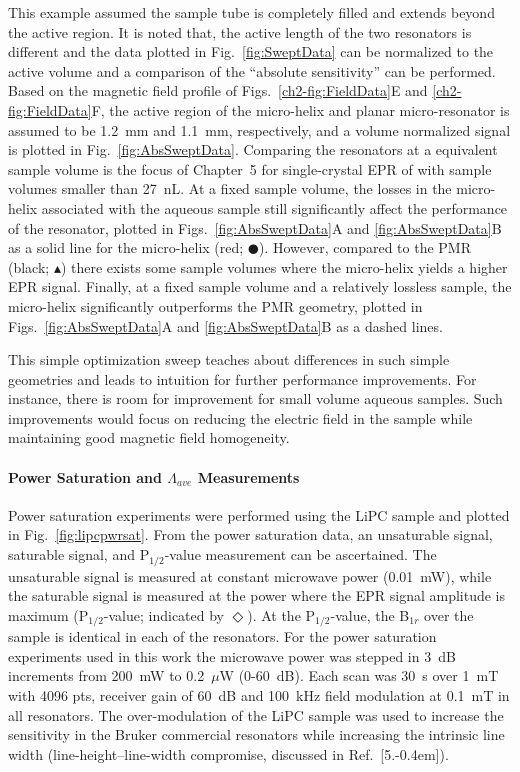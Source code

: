 This example assumed the sample tube is completely filled and extends beyond the active region. It is noted that, the active length of the two resonators is different and the data plotted in Fig.~\ref{fig:SweptData} can be normalized to the active volume and a comparison of the ``absolute sensitivity'' can be performed. Based on the magnetic field profile of  Figs.~\ref{ch2-fig:FieldData}E and \ref{ch2-fig:FieldData}F, the active region of the micro-helix and planar micro-resonator is assumed to be 1.2~mm and 1.1~mm, respectively, and a volume normalized signal is plotted in Fig.~\ref{fig:AbsSweptData}. Comparing the resonators at a equivalent sample volume is the focus of Chapter~5 for single-crystal EPR of with sample volumes smaller than 27~nL. At a fixed sample volume, the losses in the micro-helix associated with the aqueous sample still significantly affect the performance of the resonator, plotted in Figs.~\ref{fig:AbsSweptData}A and \ref{fig:AbsSweptData}B as a solid line for the micro-helix (red; $\CIRCLE$). However, compared to the PMR (black; $\blacktriangle$) there exists some sample volumes where the micro-helix yields a higher EPR signal. Finally, at a fixed sample volume and a relatively lossless sample, the micro-helix significantly outperforms the PMR geometry, plotted in Figs.~\ref{fig:AbsSweptData}A and \ref{fig:AbsSweptData}B as a dashed lines.

This simple optimization sweep teaches about differences in such simple geometries and leads to intuition for further performance improvements. For instance, there is room for improvement for small volume aqueous samples. Such improvements would focus on reducing the electric field in the sample while maintaining good magnetic field homogeneity. 


\paragraph{Power Saturation and $\Lambda_{ave}$ Measurements}
Power saturation experiments were performed using the LiPC sample and plotted in Fig.~\ref{fig:lipcpwrsat}. From the power saturation data, an unsaturable signal, saturable signal, and P$_{1/2}$-value measurement can be ascertained. The unsaturable signal is measured at constant microwave power (0.01~mW), while the saturable signal is measured at the power where the EPR signal amplitude is maximum (P$_{1/2}$-value; indicated by $\Diamond$). At the P$_{1/2}$-value, the B$_{1r}$ over the sample is identical in each of the resonators. For the power saturation experiments used in this work the microwave power was stepped in 3~dB increments from 200~mW to 0.2~$\mu$W (0-60~dB). Each scan was 30~s over 1~mT with 4096 pts, receiver gain of 60~dB and 100~kHz field modulation at 0.1~mT in all resonators. The over-modulation of the LiPC sample was used to increase the sensitivity in the Bruker commercial resonators while increasing the intrinsic line width (line-height--line-width compromise, discussed in Ref.~[5.\kern-0.4em]). 

